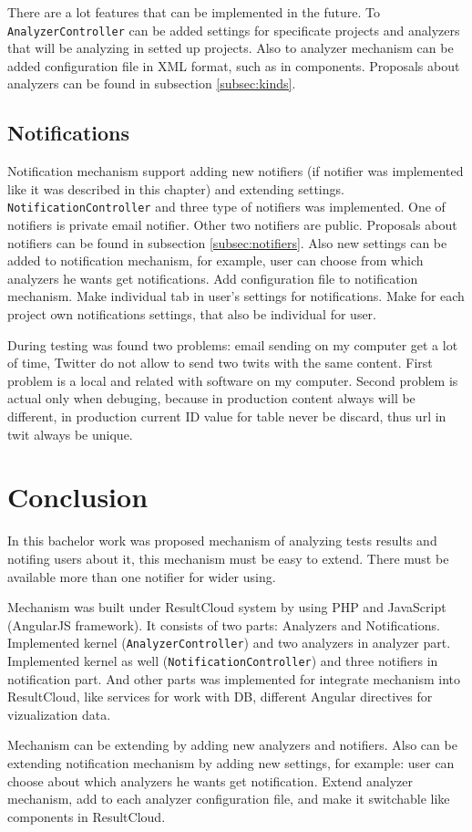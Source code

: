 There are a lot features that can be implemented in the future. To \texttt{AnalyzerController} can be added settings for specificate projects and analyzers that will be analyzing in setted up projects. Also to analyzer mechanism can be added configuration file in XML format, such as in components. Proposals about analyzers can be found in subsection \ref{subsec:kinds}.

\section{Notifications}

Notification mechanism support adding new notifiers (if notifier was implemented like it was described in this chapter) and extending settings. \texttt{NotificationController} and three type of notifiers was implemented. One of notifiers is private email notifier. Other two notifiers are public. Proposals about notifiers can be found in subsection \ref{subsec:notifiers}. Also new settings can be added to notification mechanism, for example, user can choose from which analyzers he wants get notifications. Add configuration file to notification mechanism. Make individual tab in user's settings for notifications. Make for each project own notifications settings, that also be individual for user.

During testing was found two problems: email sending on my computer get a lot of time, Twitter do not allow to send two twits with the same content. First problem is a local and related with software on my computer. Second problem is actual only when debuging, because in production content always will be different, in production current ID value for table never be discard, thus url in twit always be unique. 


\chapter{Conclusion}
\label{ch:conclusion}

In this bachelor work was proposed mechanism of analyzing tests results and notifing users about it, this mechanism must be easy to extend. There must be available more than one notifier for wider using.

Mechanism was built under ResultCloud system by using PHP and JavaScript (AngularJS framework). It consists of two parts: Analyzers and Notifications. Implemented kernel (\texttt{AnalyzerController}) and two analyzers in analyzer part. Implemented kernel as well (\texttt{NotificationController}) and three notifiers in notification part. And other parts was implemented for integrate mechanism into ResultCloud, like services for work with DB, different Angular directives for vizualization data.

Mechanism can be extending by adding new analyzers and notifiers. Also can be extending notification mechanism by adding new settings, for example: user can choose about which analyzers he wants get notification. Extend analyzer mechanism, add to each analyzer configuration file, and make it switchable like components in ResultCloud.

